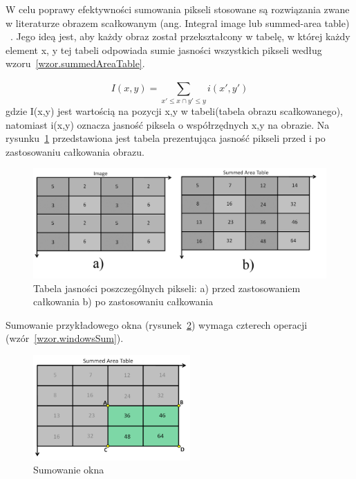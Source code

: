 \documentclass[a4paper,twoside,12pt]{book}
\begin{document}
    W celu poprawy efektywności sumowania pikseli stosowane są
    rozwiązania zwane w literaturze obrazem scałkowanym (ang. Integral image lub summed-area table)
    ~\cite{computerVision}.
    Jego ideą jest, aby każdy obraz został przekształcony w
    tabelę, w której każdy element x, y tej tabeli odpowiada sumie jasności wszystkich pikseli według
    wzoru~\ref{wzor.summedAreaTable}.

    \large
    \begin{equation}
        I(x,y) = \sum_{{x}'\leq x \cap {y}'\leq y}^{} i({x}',{y}')
        \label{wzor.summedAreaTable}
    \end{equation}
    \normalsize
    gdzie I(x,y) jest wartością na pozycji x,y w tabeli(tabela obrazu scałkowanego), natomiast i(x,y) oznacza jasność piksela o
    współrzędnych x,y na obrazie.
    Na rysunku~\ref{fig.poiprzedCalkowaniem} przedstawiona jest tabela prezentująca jasność pikseli przed i po
    zastosowaniu całkowania obrazu.
    \begin{figure}
        \centering
        \includegraphics[width=12cm]{Obrazy/poiprzedCalkowaniem.jpg}
        \caption{Tabela jasności poszczególnych pikseli: a) przed zastosowaniem całkowania b) po
        zastosowaniu całkowania~\cite{integralImages}}
        \label{fig.poiprzedCalkowaniem}
    \end{figure}

    Sumowanie przykładowego okna (rysunek~\ref{fig.sumowanieOkna}) wymaga czterech operacji (wzór~\ref{wzor.windowsSum}).
    \begin{figure}
        \centering
        \includegraphics[width=6cm]{Obrazy/sumowanieOkna.jpg}
        \caption{Sumowanie okna~\cite{integralImages}}
        \label{fig.sumowanieOkna}
    \end{figure}
\end{document}
